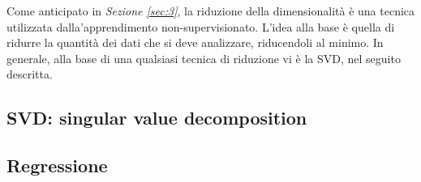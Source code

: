 \documentclass{subfiles}
\begin{document}
Come anticipato in \emph{Sezione \ref{sec:3}}, la riduzione della dimensionalità è una tecnica utilizzata dalla'apprendimento non-supervisionato.
L'idea alla base è quella di ridurre la quantità dei dati che si deve analizzare, riducendoli al minimo.
In generale, alla base di una qualsiasi tecnica di riduzione vi è la SVD, nel seguito descritta.

\subsection{SVD: singular value decomposition}

\clearpage

\subsection{Regressione}

\clearpage
\end{document}
